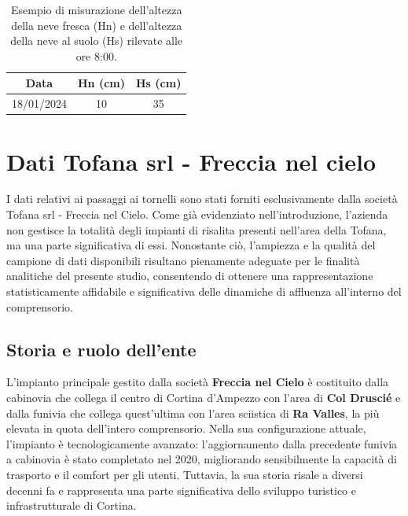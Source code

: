 \begin{table}[h]
    \centering
    \begin{tabular}{ccc}
        \toprule
        \textbf{Data} & \textbf{Hn (cm)} & \textbf{Hs (cm)} \\
        \midrule
        18/01/2024 & 10 & 35 \\
        \bottomrule
    \end{tabular}
    \caption{Esempio di misurazione dell'altezza della neve fresca (Hn) e dell'altezza della neve al suolo (Hs) rilevate alle ore 8:00.}
    \label{tab:dati_neve}
\end{table}



\section{Dati  Tofana srl - Freccia nel cielo}

I dati relativi ai passaggi ai tornelli sono stati forniti esclusivamente dalla società Tofana srl - Freccia nel Cielo. Come già evidenziato nell’introduzione, l’azienda non gestisce la totalità degli impianti di risalita presenti nell’area della Tofana, ma una parte significativa di essi.
Nonostante ciò, l’ampiezza e la qualità del campione di dati disponibili risultano pienamente adeguate per le finalità analitiche del presente studio, consentendo di ottenere una rappresentazione statisticamente affidabile e significativa delle dinamiche di affluenza all’interno del comprensorio.

\subsection{Storia e ruolo dell'ente}\label{cap:Storia_FNC}

L’impianto principale gestito dalla società \textbf{Freccia nel Cielo}  è costituito dalla cabinovia che collega il centro di Cortina d'Ampezzo con l'area di \textbf{Col Druscié} e dalla funivia che collega quest'ultima con l'area sciistica di \textbf{Ra Valles}, la più elevata in quota dell’intero comprensorio. Nella sua configurazione attuale, l’impianto è tecnologicamente avanzato: l’aggiornamento dalla precedente funivia a cabinovia è stato completato nel 2020, migliorando sensibilmente la capacità di trasporto e il comfort per gli utenti. Tuttavia, la sua storia risale a diversi decenni fa e rappresenta una parte significativa dello sviluppo turistico e infrastrutturale di Cortina.\\

